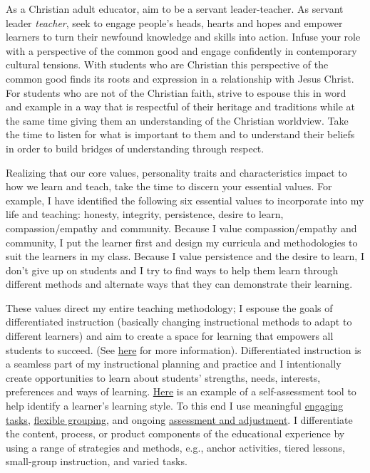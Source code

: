 \documentclass[
]{book}
\begin{document}
As a Christian adult educator, aim to be a servant leader-teacher. As servant leader \emph{teacher}, seek to engage people's heads, hearts and hopes and empower learners to turn their newfound knowledge and skills into action. Infuse your role with a perspective of the common good and engage confidently in contemporary cultural tensions. With students who are Christian this perspective of the common good finds its roots and expression in a relationship with Jesus Christ. For students who are not of the Christian faith, strive to espouse this in word and example in a way that is respectful of their heritage and traditions while at the same time giving them an understanding of the Christian worldview. Take the time to listen for what is important to them and to understand their beliefs in order to build bridges of understanding through respect.

Realizing that our core values, personality traits and characteristics impact to how we learn and teach, take the time to discern your essential values. For example, I have identified the following six essential values to incorporate into my life and teaching: honesty, integrity, persistence, desire to learn, compassion/empathy and community. Because I value compassion/empathy and community, I put the learner first and design my curricula and methodologies to suit the learners in my class. Because I value persistence and the desire to learn, I don't give up on students and I try to find ways to help them learn through different methods and alternate ways that they can demonstrate their learning.

These values direct my entire teaching methodology; I espouse the goals of differentiated instruction (basically changing instructional methods to adapt to different learners) and aim to create a space for learning that empowers all students to succeed. (See \href{https://study.com/academy/lesson/what-is-differentiated-instruction-examples-definition-activities.html}{here} for more information). Differentiated instruction is a seamless part of my instructional planning and practice and I intentionally create opportunities to learn about students' strengths, needs, interests, preferences and ways of learning. \href{http://www.educationplanner.org/students/self-assessments/learning-styles-quiz.shtml}{Here} is an example of a self-assessment tool to help identify a learner's learning style. To this end I use meaningful \href{https://www.prolaera.com/7-effective-way-to-engage-adult-learners/}{engaging tasks}, \href{https://www.kpu.ca/sites/default/files/Teaching\%20and\%20Learning/TD.1.3_Bedford\%26Wiebe\%26Tschida_Flexible_Grouping.pdf}{flexible grouping}, and ongoing \href{https://lincs.ed.gov/state-resources/federal-initiatives/teal/guide/formativeassessment}{assessment and adjustment}. I differentiate the content, process, or product components of the educational experience by using a range of strategies and methods, e.g., anchor activities, tiered lessons, small-group instruction, and varied tasks.
\end{document}
